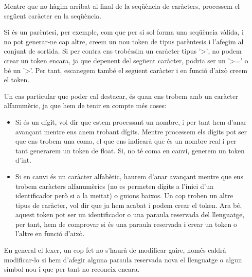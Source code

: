 ﻿\documentclass{article}
\begin{document}
                Mentre que no hàgim arribat al final de la seqüència de caràcters,
                processem el següent caràcter en la seqüència. 

                Si és un parèntesi, per exemple, com que per si sol forma una 
                seqüència vàlida, i no pot generar-ne cap altre, creem un nou 
                token de tipus parèntesis i l'afegim al conjunt de sortida. Si 
                per contra ens trobéssim un caràcter tipus '>', no podem crear 
                un token encara, ja que depenent del següent caràcter, podria ser
                un '>=' o bé un '>'. Per tant, escanegem també el següent caràcter
                i en funció d'això creem el token. 

                Un cas particular que poder cal destacar, és quan ens trobem amb
                un caràcter alfanumèric, ja que hem de tenir en compte més coses:
                
                \begin{itemize}
                \item
                    Si és un dígit, vol dir que estem processant un nombre, i per tant 
                    hem d'anar avançant mentre ens anem trobant dígits. Mentre processem
                    els dígits pot ser que ens trobem una coma, el que ens indicarà
                    que és un nombre real i per tant generarem un token de float. Si,
                    no té coma en canvi, generem un token d'int.
                \item
                    Si en canvi és un caràcter alfabètic, haurem d'anar avançant
                    mentre que ens trobem caràcters alfanumèrics (no es permeten 
                    dígits a l'inici d'un identificador però si a la meitat) o 
                    guions baixos. Un cop troben un altre tipus de caràcter, vol
                    dir que ja hem acabat i podem crear el token. Ara bé, aquest
                    token pot ser un identificador o una paraula reservada del
                    llenguatge, per tant, hem de comprovar si és una paraula
                    reservada i crear un token o l'altre en funció d'això.
                \end{itemize}

                En general el lexer, un cop fet no s'haurà de modificar gaire,
                només caldrà modificar-lo si hem d'afegir alguna paraula reservada
                nova el llenguatge o algun símbol nou i que per tant no reconeix
                encara.
\end{document}
